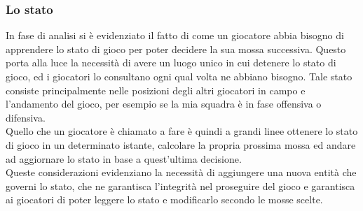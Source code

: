 %

\subsubsection{Lo stato}
\label{sec:entita_coinvolte_stato}

In fase di analisi si è evidenziato il fatto di come un giocatore abbia bisogno di apprendere lo stato di gioco per poter decidere la sua mossa successiva. Questo porta alla luce la necessità di avere un luogo unico in cui detenere lo stato di gioco, ed i giocatori lo consultano ogni qual volta ne abbiano bisogno. Tale stato consiste principalmente nelle posizioni degli altri giocatori in campo e l'andamento del gioco, per esempio se la mia squadra è in fase offensiva o difensiva.\\

Quello che un giocatore è chiamato a fare è quindi a grandi linee ottenere lo stato di gioco in un determinato istante, calcolare la propria prossima mossa ed andare ad aggiornare lo stato in base a quest'ultima decisione.\\

Queste considerazioni evidenziano la necessità di aggiungere una nuova entità che governi lo stato, che ne garantisca l'integrità nel proseguire del gioco e garantisca ai giocatori di poter leggere lo stato e modificarlo secondo le mosse scelte.
